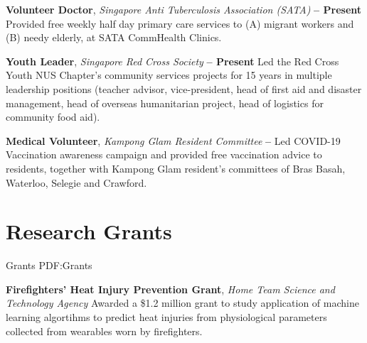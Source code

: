 \documentclass[letterpaper,10pt,oneside]{article}
\begin{document}
\begin{body}
{\textbf{Volunteer Doctor}, \textit{Singapore Anti Tuberculosis Association (SATA)}}
\hfill
\textbf{
 --
Present
}
\BulletItem
Provided free weekly half day primary care services to (A) migrant workers and (B) needy elderly, at SATA CommHealth Clinics.

\BigGap
{\textbf{Youth Leader}, \textit{Singapore Red Cross Society}}
\hfill
\textbf{
 --
Present
}
\BulletItem
Led the Red Cross Youth NUS Chapter's community services projects for 15 years in multiple leadership positions (teacher advisor, vice-president, head of first aid and disaster management, head of overseas humanitarian project, head of logistics for community food aid).

\BigGap
{\textbf{Medical Volunteer}, \textit{Kampong Glam Resident Committee}}
\hfill
\textbf{
 --
}
\BulletItem
Led COVID-19 Vaccination awareness campaign and provided free vaccination advice to residents, together with Kampong Glam resident's committees of Bras Basah, Waterloo, Selegie and Crawford.


\section
{Research Grants}
{Grants}
{PDF:Grants}

\textbf{Firefighters' Heat Injury Prevention Grant},
\textit{Home Team Science and Technology Agency}
\hfill{}
\GapNoBreak
\BulletItem
Awarded a \$1.2 million grant to study application of machine learning algortihms to predict heat injuries from physiological parameters collected from wearables worn by firefighters.
\medskip


\end{body}
\end{document}
